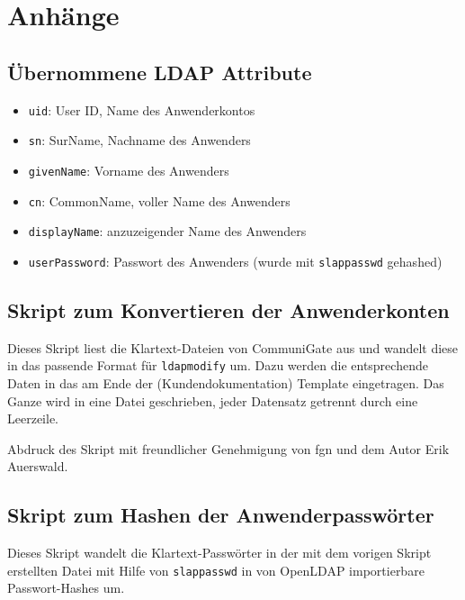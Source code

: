 \documentclass[11pt,a4paper,titlepage=firstiscover,headsepline,bibtotoc]{scrartcl} %
\begin{document}
%
%



\appendix
\newpage
\section{Anhänge}
\subsection{Übernommene LDAP Attribute} \label{sec:LDAP-Attribute}
\begin{itemize}
\item\texttt{uid}: User ID, Name des Anwenderkontos
\item\texttt{sn}: SurName, Nachname des Anwenders
\item\texttt{givenName}: Vorname des Anwenders
\item\texttt{cn}: CommonName, voller Name des Anwenders
\item\texttt{displayName}: anzuzeigender Name des Anwenders
\item\texttt{userPassword}: Passwort des Anwenders (wurde mit \texttt{slappasswd} gehashed)
\end{itemize}


\newpage
\subsection{Skript zum Konvertieren der Anwenderkonten}\label{sec:SkriptA}

Dieses Skript liest die Klartext-Dateien von CommuniGate aus und wandelt diese in das passende Format für \texttt{ldapmodify} um. Dazu werden die entsprechende Daten in das am Ende der  (Kundendokumentation) Template eingetragen. Das Ganze wird in eine Datei geschrieben, jeder Datensatz getrennt durch eine Leerzeile.

Abdruck des Skript mit freundlicher Genehmigung von fgn und dem Autor Erik Auerswald.

\newpage
\subsection{Skript zum Hashen der Anwenderpasswörter}\label{sec:SkriptB}

Dieses Skript wandelt die Klartext-Passwörter in der mit dem vorigen Skript erstellten Datei mit Hilfe von \texttt{slappasswd} in von OpenLDAP importierbare Passwort-Hashes um.
\end{document}
